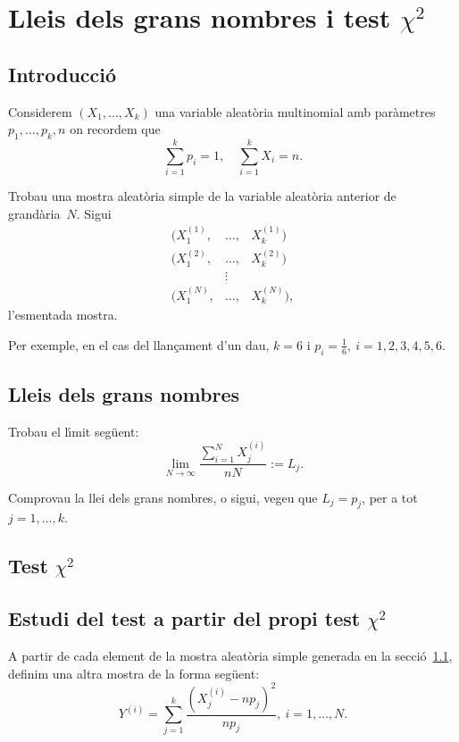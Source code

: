 \section{Lleis dels grans nombres i test $\chi^2$}

\subsection{Introducci\'o}
\label{INTRODUCCIO}

Considerem $(X_1,\ldots,X_k)$ una variable aleat\`oria multinomial amb 
par\`ametres\break $p_1,\ldots,p_k,n$ on recordem que 
\[
\sum_{i=1}^k p_i =1,\quad \sum_{i=1}^k X_i =n.
\] 

Trobau una mostra aleat\`oria 
simple de la variable aleat\`oria anterior
de grand\`aria~$N$. Sigui
\[
\begin{array}{lcl}
(X_1^{(1)},&\ldots,&X_k^{(1)})\\
(X_1^{(2)},&\ldots,&X_k^{(2)})\\
&\vdots&\\
(X_1^{(N)},&\ldots,&X_k^{(N)}),
\end{array}
\]
l'esmentada mostra.

Per exemple, en el cas del llan\c{c}ament d'un dau, $k=6$ i
$p_i =\frac{1}{6},\ i=1,2,3,4,5,6$.


\subsection{Lleis dels grans nombres}

Trobau el l\'{\i}mit seg\"uent:
\[
\lim_{N\to\infty} \frac{\sum\limits_{i=1}^{N} X_j^{(i)}}{n N} := L_j.
\]

Comprovau la llei dels grans nombres, 
o sigui, vegeu que $L_j =p_j$, per a tot $j=1,\ldots,k$.

\subsection{Test $\chi^2$}

\subsection*{Estudi del test a partir del propi test $\chi^2$}

A partir de cada element de la mostra aleat\`oria simple generada 
en la secci\'o~\ref{INTRODUCCIO}, definim una altra mostra de la forma seg\"uent:
\[
Y^{(i)}=\sum_{j=1}^k \frac{{(X_j^{(i)}- n p_j)}^2}{n p_j},\ i=1,\ldots,N.
\]

